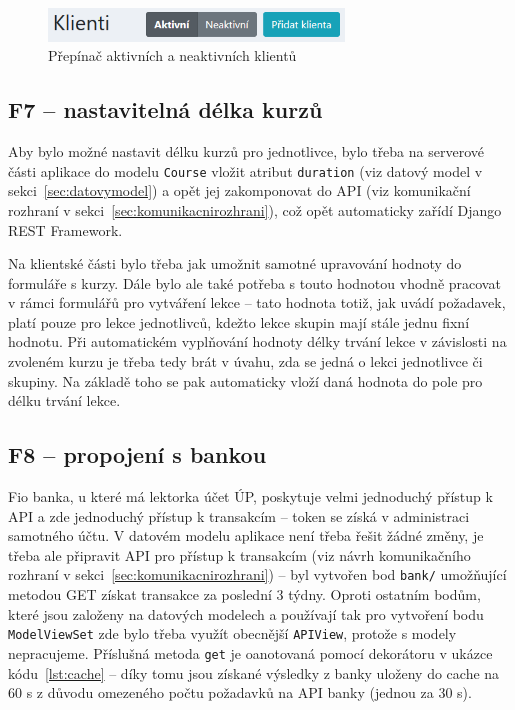 \begin{figure}[h]\centering
    \includegraphics[width=0.7\textwidth]{img/ui-screen-prepinac-aktivity.png}
    \caption{Přepínač aktivních a neaktivních klientů}\label{fig:ui-screen-prepinac-aktivity}
\end{figure}

\subsection{F7 -- nastavitelná délka kurzů}

Aby bylo možné nastavit délku kurzů pro jednotlivce, bylo třeba na serverové části aplikace do modelu \verb|Course| vložit atribut \verb|duration| (viz datový model v sekci~\ref{sec:datovymodel}) a opět jej zakomponovat do API (viz komunikační rozhraní v sekci~\ref{sec:komunikacnirozhrani}), což opět automaticky zařídí Django REST Framework.

Na klientské části bylo třeba jak umožnit samotné upravování hodnoty do formuláře s kurzy. Dále bylo ale také potřeba s touto hodnotou vhodně pracovat v rámci formulářů pro vytváření lekce -- tato hodnota totiž, jak uvádí požadavek, platí pouze pro lekce jednotlivců, kdežto lekce skupin mají stále jednu fixní hodnotu. Při automatickém vyplňování hodnoty délky trvání lekce v závislosti na zvoleném kurzu je třeba tedy brát v úvahu, zda se jedná o lekci jednotlivce či skupiny. Na základě toho se pak automaticky vloží daná hodnota do pole pro délku trvání lekce.

\subsection{F8 -- propojení s bankou}

Fio banka, u které má lektorka účet ÚP, poskytuje velmi jednoduchý přístup k API a zde jednoduchý přístup k transakcím -- token se získá v administraci samotného účtu. V datovém modelu aplikace není třeba řešit žádné změny, je třeba ale připravit API pro přístup k transakcím (viz návrh komunikačního rozhraní v sekci~\ref{sec:komunikacnirozhrani}) -- byl vytvořen bod \verb|bank/| umožňující metodou GET získat transakce za poslední 3 týdny. Oproti ostatním bodům, které jsou založeny na datových modelech a používají tak pro vytvoření bodu \verb|ModelViewSet| zde bylo třeba využít obecnější \verb|APIView|, protože s modely nepracujeme. Příslušná metoda \verb|get| je oanotovaná pomocí dekorátoru v ukázce kódu~\ref{lst:cache} -- díky tomu jsou získané výsledky z banky uloženy do cache na 60 s z důvodu omezeného počtu požadavků na API banky (jednou za 30 s).


